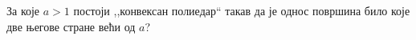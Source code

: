 \problem
За које $a > 1$ постоји ,,конвексан полиедар`` такав да је однос површина било
које две његове стране већи од $a$?

\solution
\endproblem
